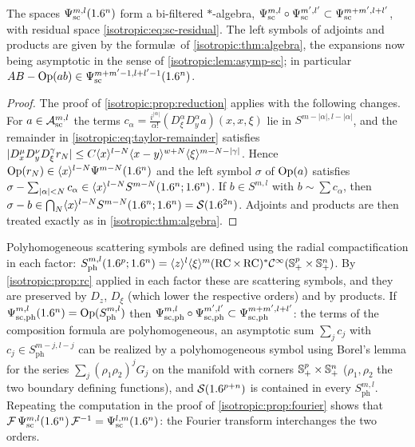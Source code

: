 \begin{theorem}\label{isotropic:thm:sc-algebra}
The spaces $\Psi^{m,l}_{\mathrm{sc}}(1.6^n)$ form a bi-filtered $*$-algebra,
$\Psi^{m,l}_{\mathrm{sc}}\circ\Psi^{m',l'}_{\mathrm{sc}}\subset\Psi^{m+m',l+l'}_{\mathrm{sc}}$, with residual space
\eqref{isotropic:eq:sc-residual}. The left symbols of adjoints and products are
given by the formul\ae\ of \cref{isotropic:thm:algebra}, the expansions now being
asymptotic in the sense of \cref{isotropic:lem:asymp-sc}; in particular
$AB-\operatorname{Op}(ab)\in\Psi^{m+m'-1,l+l'-1}_{\mathrm{sc}}(1.6^n)$.
\end{theorem}
\begin{proof}
The proof of \cref{isotropic:prop:reduction} applies with the following
changes. For $a\in\mathcal{A}^{m,l}_{\mathrm{sc}}$ the terms
$c_\alpha=\frac{i^{|\alpha|}}{\alpha!}(D_\xi^\alpha D_y^\alpha a)(x,x,\xi)$ lie in
$S^{m-|\alpha|,l-|\alpha|}$, and the remainder in
\eqref{isotropic:eq:taylor-remainder} satisfies
$|D_x^\mu D_y^\nu D_\xi^\gamma r_N|\le C\langle x\rangle^{l-N}\langle x-y\rangle^{w+N}\langle \xi\rangle^{m-N-|\gamma|}$.
Hence $\operatorname{Op}(r_N)\in\langle x\rangle^{l-N}\Psi^{m-N}(1.6^n)$ and the left symbol $\sigma$
of $\operatorname{Op}(a)$ satisfies $\sigma-\sum_{|\alpha|<N}c_\alpha\in\langle x\rangle^{l-N}S^{m-N}(1.6^n;1.6^n)$.
If $b\in S^{m,l}$ with $b\sim\sum c_\alpha$, then
$\sigma-b\in\bigcap_N\langle x\rangle^{l-N}S^{m-N}(1.6^n;1.6^n)=\mathcal{S}(1.6^{2n})$. Adjoints and
products are then treated exactly as in \cref{isotropic:thm:algebra}.
\end{proof}

\begin{remark}\label{isotropic:rem:sc-ph}
Polyhomogeneous scattering symbols are defined using the radial
compactification in each factor:
$S^{m,l}_{\mathrm{ph}}(1.6^p;1.6^n)=\langle z\rangle^l\langle \xi\rangle^m(\operatorname{RC}\times\operatorname{RC})^*\mathcal{C}^\infty(\mathbb{S}^{p}_{+}\times\mathbb{S}^{n}_{+})$.
By \cref{isotropic:prop:rc} applied in each factor these are scattering
symbols, and they are preserved by $D_z$, $D_\xi$ (which lower the respective
orders) and by products. If
$\Psi^{m,l}_{\mathrm{sc,ph}}(1.6^n)=\operatorname{Op}(S^{m,l}_{\mathrm{ph}})$ then
$\Psi^{m,l}_{\mathrm{sc,ph}}\circ\Psi^{m',l'}_{\mathrm{sc,ph}}\subset\Psi^{m+m',l+l'}_{\mathrm{sc,ph}}$:
the terms of the composition formula are polyhomogeneous, an asymptotic sum
$\sum_j c_j$ with $c_j\in S^{m-j,l-j}_{\mathrm{ph}}$ can be realized by a
polyhomogeneous symbol using Borel's lemma for the series
$\sum_j(\rho_1\rho_2)^jG_j$ on the manifold with corners $\mathbb{S}^{p}_{+}\times\mathbb{S}^{n}_{+}$
($\rho_1,\rho_2$ the two boundary defining functions), and $\mathcal{S}(1.6^{p+n})$ is
contained in every $S^{m,l}_{\mathrm{ph}}$. Repeating the computation in the
proof of \cref{isotropic:prop:fourier} shows that
$\mathcal{F}\,\Psi^{m,l}_{\mathrm{sc}}(1.6^n)\,\mathcal{F}^{-1}=\Psi^{l,m}_{\mathrm{sc}}(1.6^n)$: the Fourier transform
interchanges the two orders.
\end{remark}

